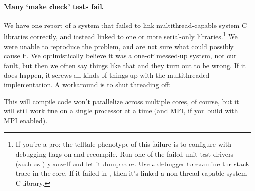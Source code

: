   \vspace{1ex}
  \vspace{1ex}

\paragraph{Many `make check' tests fail.} We have one report of a
system that failed to link multithread-capable system C libraries
correctly, and instead linked to one or more serial-only
libraries.\footnote{If you're a pro: the telltale phenotype of this
  failure is to configure with debugging flags on and recompile. Run
  one of the failed unit test drivers (such as
  ) yourself and let it dump core. Use a
  debugger to examine the stack trace in the core. If it failed in
  , then it's linked a non-thread-capable
  system C library.} We were unable to reproduce the problem, and are
not sure what could possibly cause it. We optimistically believe it
was a one-off messed-up system, not our fault, but then we often say
things like that and they turn out to be wrong. If it does happen, it
screws all kinds of things up with the multithreaded implementation. A
workaround is to shut threading off:

  \vspace{1ex}
  \vspace{1ex}

This will compile code won't parallelize across multiple cores, of
course, but it will still work fine on a single processor at a time
(and MPI, if you build with MPI enabled).

